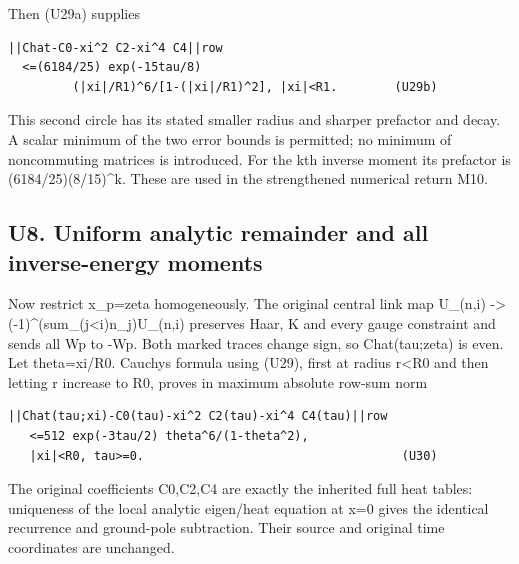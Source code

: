 \documentclass[11pt,a4paper]{article}
\renewcommand{\[}{\begingroup\small\originaldisplaystart}
\renewcommand{\]}{\originaldisplayend\endgroup}
\begin{document}
Then (U29a) supplies

\begin{verbatim}
||Chat-C0-xi^2 C2-xi^4 C4||row
  <=(6184/25) exp(-15tau/8)
         (|xi|/R1)^6/[1-(|xi|/R1)^2], |xi|<R1.        (U29b)
\end{verbatim}

This second circle has its stated smaller radius and sharper prefactor
and decay. A scalar minimum of the two error bounds is permitted; no
minimum of noncommuting matrices is introduced. For the kth inverse
moment its prefactor is
{(\allowbreak{}6\allowbreak{}1\allowbreak{}8\allowbreak{}4\allowbreak{}/\allowbreak{}2\allowbreak{}5\allowbreak{})\allowbreak{}(\allowbreak{}8\allowbreak{}/\allowbreak{}1\allowbreak{}5\allowbreak{})\allowbreak{}\textasciicircum{}\allowbreak{}k\allowbreak{}.\allowbreak{}}
These are used in the strengthened numerical return M10.

\subsection{U8. Uniform analytic remainder and all inverse-energy
moments}\label{u8.-uniform-analytic-remainder-and-all-inverse-energy-moments}

Now restrict x\_p=zeta homogeneously. The original central link map
U\_(n,i) -\textgreater{}
{(\allowbreak{}-\allowbreak{}1\allowbreak{})\allowbreak{}\textasciicircum{}\allowbreak{}(\allowbreak{}s\allowbreak{}u\allowbreak{}m\allowbreak{}\_\allowbreak{}(\allowbreak{}j\allowbreak{}\textless{}\allowbreak{}i\allowbreak{})\allowbreak{}n\allowbreak{}\_\allowbreak{}j\allowbreak{})\allowbreak{}U\allowbreak{}\_\allowbreak{}(\allowbreak{}n\allowbreak{},\allowbreak{}i\allowbreak{})\allowbreak{}}
preserves Haar, K and every gauge constraint and sends all Wp to -Wp.
Both marked traces change sign, so Chat(tau;zeta) is even. Let
theta=\textbar xi\textbar/R0. Cauchy\textquotesingle s formula using
(U29), first at radius r\textless R0 and then letting r increase to R0,
proves in maximum absolute row-sum norm

\begin{verbatim}
||Chat(tau;xi)-C0(tau)-xi^2 C2(tau)-xi^4 C4(tau)||row
   <=512 exp(-3tau/2) theta^6/(1-theta^2),
   |xi|<R0, tau>=0.                                    (U30)
\end{verbatim}

The original coefficients C0,C2,C4 are exactly the inherited full heat
tables: uniqueness of the local analytic eigen/heat equation at x=0
gives the identical recurrence and ground-pole subtraction. Their source
and original time coordinates are unchanged.
\end{document}
